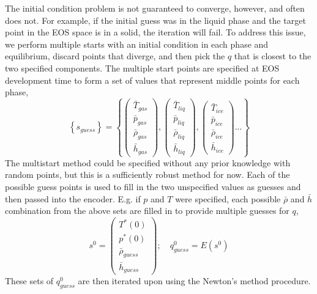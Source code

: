 \documentclass[]{article}
\begin{document}
The initial condition problem is not guaranteed to converge, however,
and often does not.
For example, if the initial guess was in the liquid phase and the target point
in the EOS space is in a solid, the iteration will fail.
To address this issue, we perform multiple starts with an initial condition in each
phase and equilibrium, discard points that diverge, and then pick the
\(q\) that is closest to the two specified components. The multiple
start points are specified at EOS development time to form a set of
values that represent middle points for each phase,
\begin{equation}
\left\{s_{guess}\right\} = \left\{ \left(\begin{array}{c}
\bar{T}_{gas}\\
\bar{p}_{gas}\\
\bar{\rho}_{gas}\\
\bar{h}_{gas}
\end{array}\right),\left(\begin{array}{c}
\bar{T}_{liq}\\
\bar{p}_{liq}\\
\bar{\rho}_{liq}\\
\bar{h}_{liq}
\end{array}\right),\left(\begin{array}{c}
\bar{T}_{ice}\\
\bar{p}_{ice}\\
\bar{\rho}_{ice}\\
\bar{h}_{ice}
\end{array}\right)... \right\}
  \end{equation}
The multistart method could be specified without any prior knowledge
with random points, but this is a sufficiently robust method for
now. Each of the possible guess points is used to fill in the two
unspecified values as guesses and then passed into the encoder.
E.g. if $p$ and $T$ were specified, each possible $\bar{\rho}$ and
$\bar{h}$ combination from the above sets are filled in to provide
multiple guesses for $q$,
\begin{equation}
s^0 = \left(\begin{array}{c}
T^*(0)\\
p^*(0)\\
\bar{\rho}_{guess}\\
\bar{h}_{guess}
\end{array}\right);\quad q^0_{guess}=E\left(s^0\right)
 \end{equation}
 These sets of $q^0_{guess}$ are then iterated upon using the Newton's
 method procedure. 
\end{document}
